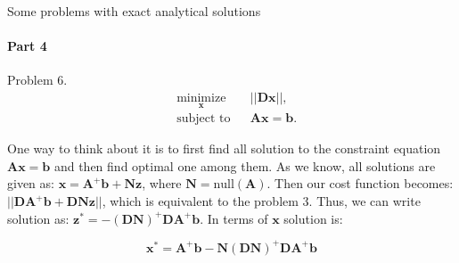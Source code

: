 \documentclass{beamer}
\begin{document}
\begin{frame}{Some problems with exact analytical solutions}
\framesubtitle{Part 4}
\begin{flushleft}

Problem 6. 
%
\begin{equation}
\begin{aligned}
& \underset{\mathbf{x}}{\text{minimize}}
& & || \mathbf{D}\mathbf{x} ||, \\
& \text{subject to}
& & \mathbf{A} \mathbf{x} = \mathbf{b}.
\end{aligned}
\end{equation}

One way to think about it is to first find all solution to the constraint equation $\mathbf{A} \mathbf{x} = \mathbf{b}$ and then find optimal one among them. As we know, all solutions are given as: $\mathbf{x} = \mathbf{A}^+\mathbf{b} + \mathbf{N}\mathbf{z}$, where $\mathbf{N} = \text{null}(\mathbf{A})$. Then our cost function becomes: $|| \mathbf{D}\mathbf{A}^+\mathbf{b} +  \mathbf{D}\mathbf{N}\mathbf{z} ||$, which is equivalent to the problem 3. Thus, we can write solution as: $\mathbf{z}^* = -(\mathbf{D}\mathbf{N})^+ \mathbf{D}\mathbf{A}^+\mathbf{b}$. In terms of $\mathbf{x}$ solution is:

\begin{equation}
    \mathbf{x}^* = \mathbf{A}^+\mathbf{b}-\mathbf{N}(\mathbf{D}\mathbf{N})^+ \mathbf{D}\mathbf{A}^+\mathbf{b}
\end{equation}

\end{flushleft}
\end{frame}
\end{document}
